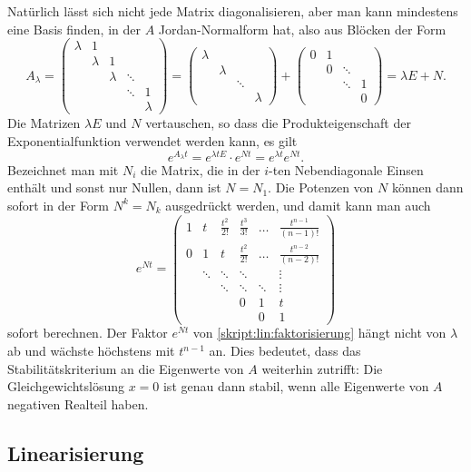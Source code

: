 Natürlich lässt sich nicht jede Matrix diagonalisieren, aber man kann
mindestens eine Basis finden, in der $A$ Jordan-Normalform hat, also aus
Blöcken der Form
\[
A_{\lambda}
=
\begin{pmatrix}
\lambda&   1   &       &       &       \\
       &\lambda&   1   &       &       \\
       &       &\lambda&\ddots &       \\
       &       &       &\ddots &    1  \\
       &       &       &       &\lambda
\end{pmatrix}
=
\begin{pmatrix}
\lambda&       &       &       \\
       &\lambda&       &       \\
       &       &\ddots &       \\
       &       &       &\lambda
\end{pmatrix}
+
\begin{pmatrix}
   0   &   1   &       &       \\
       &   0   &\ddots &       \\
       &       &\ddots &   1   \\
       &       &       &   0
\end{pmatrix}
=
\lambda E + N.
\]
Die Matrizen $\lambda E$ und $N$ vertauschen, so dass die
Produkteigenschaft der Exponentialfunktion verwendet werden kann,
es gilt
\begin{equation}
e^{A_\lambda t}
=
e^{\lambda tE}\cdot e^{Nt}
=
e^{\lambda t} e^{Nt}.
\label{skript:lin:faktorisierung}
\end{equation}
Bezeichnet man mit $N_i$ die Matrix, die in der $i$-ten Nebendiagonale
Einsen enthält und sonst nur Nullen, dann ist $N=N_1$.
Die Potenzen von $N$ können dann sofort in der Form $N^k=N_k$ ausgedrückt
werden, und damit kann man auch
\begin{equation}
e^{Nt}
=
\begin{pmatrix}
1&t&\frac{t^2}{2!}&\frac{t^3}{3!}& \dots & \frac{t^{n-1}}{(n-1)!}\\
0&1&       t      &\frac{t^2}{2!}& \dots & \frac{t^{n-2}}{(n-2)!}\\
      &\ddots&\ddots& \ddots     &       & \vdots                \\
      &      &\ddots& \ddots     &\ddots & \vdots                \\
      &      &      &         0  &    1  & t \\
      &      &      &            &    0  & 1
\end{pmatrix}
\end{equation}
sofort berechnen.
Der Faktor $e^{Nt}$ von \eqref{skript:lin:faktorisierung}
hängt nicht von $\lambda$ ab und wächste höchstens mit $t^{n-1}$ an.
Dies bedeutet, dass das Stabilitätskriterium an die Eigenwerte von $A$
weiterhin zutrifft: Die Gleichgewichtslösung $x=0$ ist genau dann stabil,
wenn alle Eigenwerte von $A$ negativen Realteil haben.

\subsection{Linearisierung}













